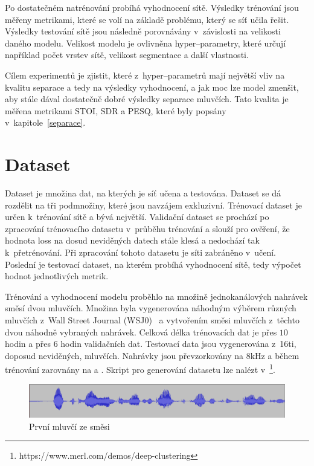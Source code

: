 Po dostatečném natrénování probíhá vyhodnocení sítě. Výsledky trénování jsou měřeny metrikami, které se volí na základě problému, který se síť učila řešit. Výsledky testování sítě jsou následně porovnávány v~závislosti na velikosti daného modelu. Velikost modelu je ovlivněna hyper--parametry, které určují například počet vrstev sítě, velikost segmentace a další vlastnosti.

Cílem experimentů je zjistit, které z~hyper--parametrů mají největší vliv na kvalitu separace a tedy na výsledky vyhodnocení, a jak moc lze model zmenšit, aby stále dával dostatečně dobré výsledky separace mluvčích. Tato kvalita je měřena metrikami STOI, SDR a PESQ, které byly popsány v~kapitole~\ref{separace}.


\section{Dataset}
Dataset je množina dat, na kterých je síť učena a testována. Dataset se dá rozdělit na tři podmnožiny, které jsou navzájem exkluzivní. Trénovací dataset je určen k~trénování sítě a bývá největší. Validační dataset se prochází po zpracování trénovacího datasetu v~průběhu trénování a slouží pro ověření, že hodnota loss na dosud neviděných datech stále klesá a nedochází tak k~přetrénování. Při zpracování tohoto datasetu je síti zabráněno v~učení. Poslední je testovací dataset, na kterém probíhá vyhodnocení sítě, tedy výpočet hodnot jednotlivých metrik. 

Trénování a vyhodnocení modelu proběhlo na množině jednokanálových nahrávek směsí dvou mluvčích. Množina byla vygenerována náhodným výběrem různých mluvčích z~Wall Street Journal (WSJ0)~\cite{DBLP-dataset} a vytvořením směsi mluvčích z~těchto dvou náhodně vybraných nahrávek. Celková délka trénovacích dat je přes $10$ hodin a přes $6$ hodin validačních dat. Testovací data jsou vygenerována z~16ti, doposud neviděných, mluvčích. Nahrávky jsou převzorkovány na 8kHz a během trénování zarovnány na  a . Skript pro generování datasetu lze nalézt v~\footnote{https://www.merl.com/demos/deep-clustering}.

\begin{figure}[H]
    \centering
    \includegraphics[scale=0.35]{obrazky-figures/dataset-s1.png}
    \caption{\label{fig:ref-s1}První mluvčí ze směsi}
\end{figure}


